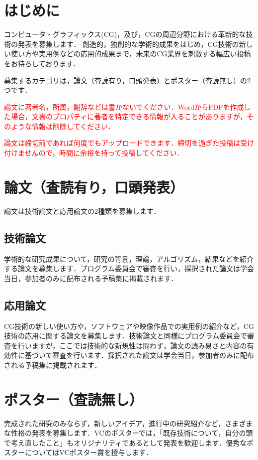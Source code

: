 \documentclass{jarticle}
\newcommand{\red}[1]{\textcolor{red}{#1}}
\begin{document}

\section{はじめに}
コンピュータ・グラフィックス(CG)，及び，CGの周辺分野における革新的な技術の発表を募集します．
創造的，独創的な学術的成果をはじめ，CG技術の新しい使い方や実用例などの応用的成果まで，未来のCG業界を刺激する幅広い投稿をお待ちしております．

募集するカテゴリは，論文（査読有り，口頭発表）とポスター（査読無し）の2つです．

\red{論文に著者名，所属，謝辞などは書かないでください．WordからPDFを作成した場合，文書のプロパティに著者を特定できる情報が入ることがありますが，そのような情報は削除してください．}

\red{論文は締切前であれば何度でもアップロードできます．締切を過ぎた投稿は受け付けませんので，時間に余裕を持って投稿してください．}


\section{論文（査読有り，口頭発表）}
論文は技術論文と応用論文の2種類を募集します．

\subsection{技術論文}
学術的な研究成果について，研究の背景，理論，アルゴリズム，結果などを紹介する論文を募集します．プログラム委員会で審査を行い，採択された論文は学会当日，参加者のみに配布される予稿集に掲載されます．

\subsection{応用論文}
CG技術の新しい使い方や，ソフトウェアや映像作品での実用例の紹介など，CG技術の応用に関する論文を募集します．技術論文と同様にプログラム委員会で審査を行いますが，ここでは技術的な新規性は問わず，論文の読み易さと内容の有効性に基づいて審査を行います．採択された論文は学会当日，参加者のみに配布される予稿集に掲載されます．

\section{ポスター（査読無し）}
完成された研究のみならず，新しいアイデア，進行中の研究紹介など，さまざまな性格の発表を募集します．VCのポスターでは，「既存技術について，自分の頭で考え直したこと」もオリジナリティであるとして発表を歓迎します．優秀なポスターについてはVCポスター賞を授与します．

\small

\nocite{*}

\end{document}
